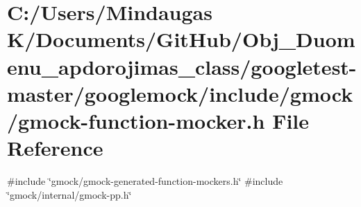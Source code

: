 \hypertarget{googletest-master_2googlemock_2include_2gmock_2gmock-function-mocker_8h}{}\section{C\+:/\+Users/\+Mindaugas K/\+Documents/\+Git\+Hub/\+Obj\+\_\+\+Duomenu\+\_\+apdorojimas\+\_\+class/googletest-\/master/googlemock/include/gmock/gmock-\/function-\/mocker.h File Reference}
\label{googletest-master_2googlemock_2include_2gmock_2gmock-function-mocker_8h}
{\ttfamily \#include \char`\"{}gmock/gmock-\/generated-\/function-\/mockers.\+h\char`\"{}}\newline
{\ttfamily \#include \char`\"{}gmock/internal/gmock-\/pp.\+h\char`\"{}}\newline
